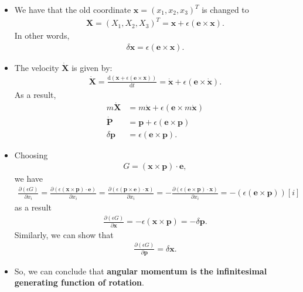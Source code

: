 \documentclass[10pt]{article}
\newcommand{\dee}{\mathrm{d}}
\newcommand{\ve}[1]{\mathbf{#1}}
\begin{document}
\begin{itemize}
    \item We have that the old coordinate $\ve{x} = (x_1, x_2, x_3)^T$ is changed to
    \begin{align*}
      \ve{X} = (X_1, X_2, X_3)^T = \ve{x} + \epsilon(\ve{e} \times \ve{x}).
    \end{align*}
    In other words,
    \begin{align*}
      \delta\ve{x} = \epsilon(\ve{e} \times \ve{x}).
    \end{align*}

    \item The velocity $\dot{\ve{X}}$ is given by:
    \begin{align*}
      \dot{\ve{X}} 
      = \frac{\dee (\ve{x} + \epsilon(\ve{e} \times \ve{x}))}{\dee t}
      = \dot{\ve{x}} + \epsilon(\ve{e} \times \dot{\ve{x}}).
    \end{align*}
    As a result,
    \begin{align*}
      m\dot{\ve{X}} 
      &= m\dot{\ve{x}} + \epsilon(\ve{e} \times m\dot{\ve{x}})\\
      \dot{\ve{P}} 
      &= \ve{p} + \epsilon(\ve{e} \times \ve{p}) \\
      \delta \ve{p} 
      &= \epsilon(\ve{e} \times \ve{p}).
    \end{align*}

    \item Choosing
    \begin{align*}
      G = (\ve{x} \times \ve{p}) \cdot \ve{e},
    \end{align*}
    we have
    \begin{align*}
      \frac{\partial (\epsilon G)}{\partial x_i} 
      = \frac{\partial (\epsilon (\ve{x} \times \ve{p}) \cdot \ve{e})}{\partial x_i} 
      = \frac{\partial (\epsilon (\ve{p} \times \ve{e}) \cdot \ve{x})}{\partial x_i} 
      = -\frac{\partial (\epsilon (\ve{e} \times \ve{p}) \cdot \ve{x})}{\partial x_i} 
      = - (\epsilon(\ve{e} \times \ve{p}))[i]
    \end{align*}
    as a result
    \begin{align*}
      \frac{\partial (\epsilon G)}{\partial \ve{x}} = -\epsilon(\ve{x} \times \ve{p}) = -\delta \ve{p}.
    \end{align*}
    Similarly, we can show that
    \begin{align*}
      \frac{\partial (\epsilon G)}{\partial \ve{p}} = \delta\ve{x}.
    \end{align*}

    \item So, we can conclude that {\bf angular momentum is the infinitesimal generating function of rotation}.
  \end{itemize}
\end{document}

